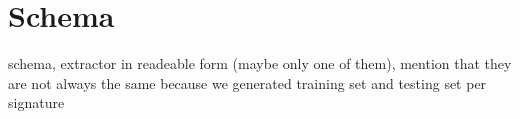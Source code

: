 \chapter{Schema} \label{app:schema}
schema, extractor in readeable form (maybe only one of them), mention that they are not always the same because we generated training set and testing set per signature